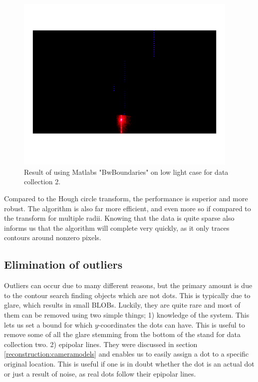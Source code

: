 \begin{figure}[H]
    \centering
    \includegraphics[width=0.95\textwidth]{figures/ImageAnalysis/ContourSearch/bwboundaries_lowlight2.png}
    \caption{Result of using Matlabs "BwBoundaries" on low light case for data collection 2.}
    \label{fig:fig:bwboundary_lowlight2}
\end{figure}
\FloatBarrier
Compared to the Hough circle transform, the performance is superior and more robust. The algorithm is also far more efficient, and even more so if compared to the transform for multiple radii. Knowing that the data is quite sparse also informs us that the algorithm will complete very quickly, as it only traces contours around nonzero pixels. 




\subsection{Elimination of outliers} \label{imageanalysis:outliers}
Outliers can occur due to many different reasons, but the primary amount is due to the contour search finding objects which are not dots. This is typically due to glare, which results in small BLOBs. Luckily, they are quite rare and most of them can be removed using two simple things;
1) knowledge of the system. This lets us set a bound for which $y$-coordinates the dots can have. This is useful to remove some of all the glare stemming from the bottom of the stand for data collection two. 
2) epipolar lines. They were discussed in section \ref{reconstruction:cameramodels} and enables us to easily assign a dot to a specific original location. This is useful if one is in doubt whether the dot is an actual dot or just a result of noise, as real dots follow their epipolar lines. 




